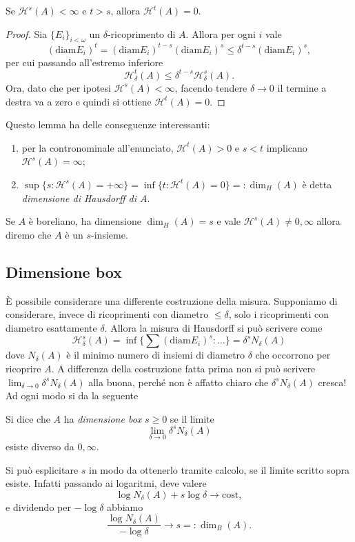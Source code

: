 \begin{lemma}
	 Se $\mathcal H^{s}(A)<\infty$ e $t>s$, allora $\mathcal H^{t}(A) = 0$.
\end{lemma}
\begin{proof}
	Sia $\{E_{i}\}_{i<\omega}$ un $\delta$-ricoprimento di $A$. Allora per ogni $i$ vale 
	$$(\text{diam} E_{i})^{t} = (\text{diam} E_{i})^{t-s}(\text{diam} E_{i})^{s} \leq \delta^{t-s}(\text{diam} E_{i})^{s},$$
	per cui passando all'estremo inferiore
	$$\mathcal H_{\delta}^{t}(A) \leq \delta^{t-s}\mathcal H_{\delta}^{s}(A).$$
	Ora, dato che per ipotesi $\mathcal H^{s}(A)<\infty$, facendo tendere $\delta\to0$ il termine a destra va a zero e quindi si ottiene $\mathcal H^{t}(A) = 0$.
\end{proof}

\begin{osservazione}
	Questo lemma ha delle conseguenze interessanti: 
	\begin{enumerate}
		\item per la contronominale all'enunciato, $\mathcal H^{t}(A)>0$ e $s<t$ implicano $\mathcal H^{s}(A)=\infty$;
		\item $\sup\{s:\mathcal H^{s}(A) = +\infty\} = \inf\{t:\mathcal H^{t}(A) = 0\} =:\dim_{H}(A)$ è detta \emph{dimensione di Hausdorff di $A$}.
	\end{enumerate}
\end{osservazione}

\begin{definizione}
	Se $A$ è boreliano, ha dimensione $\dim_{H}(A) = s$ e vale $\mathcal H^{s}(A) \neq 0,\infty$ allora diremo che $A$ è un $s$-insieme.
\end{definizione}


\subsection{Dimensione box}

È possibile considerare una differente costruzione della misura. 
Supponiamo di considerare, invece di ricoprimenti con diametro $\leq\delta$, solo i ricoprimenti con diametro esattamente $\delta$.
Allora la misura di Hausdorff si può scrivere come 
$$\mathcal H^{s}_{\delta}(A) = \inf\{\sum(\text{diam}E_{i})^{s}: \dots\} = \delta^{s}N_{\delta}(A)$$
dove $N_{\delta}(A)$ è il minimo numero di insiemi di diametro $\delta$ che occorrono per ricoprire $A$. 
A differenza della costruzione fatta prima non si può scrivere $\lim_{\delta\to 0}\delta^{s}N_{\delta}(A)$ alla buona, perché non è affatto chiaro che $\delta^{s}N_{\delta}(A)$ cresca!
Ad ogni modo si da la seguente 
\begin{definizione}
	Si dice che $A$ ha \emph{dimensione box} $s\geq0$ se il limite
	$$\lim_{\delta\to 0}\delta^{s}N_{\delta}(A)$$
	esiste diverso da $0,\infty$.
\end{definizione}
Si può esplicitare $s$ in modo da ottenerlo tramite calcolo, se il limite scritto sopra esiste. Infatti passando ai logaritmi, deve valere 
$$\log N_{\delta}(A) + s\log\delta\to\text{cost},$$
e dividendo per $-\log \delta$ abbiamo 
$$\frac{\log N_{\delta}(A)}{-\log\delta}\to s =:\dim_{B}(A).$$

